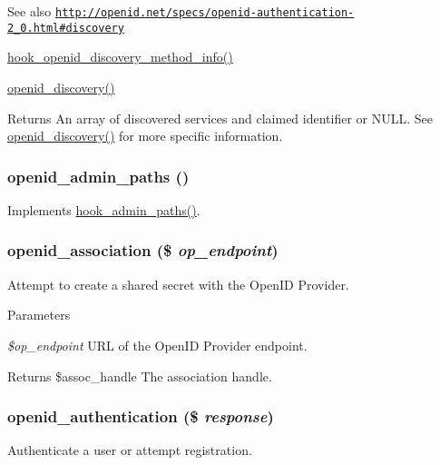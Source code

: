 \begin{DoxySeeAlso}{See also}
\href{http://openid.net/specs/openid-authentication-2_0.html#discovery}{\tt http://openid.net/specs/openid-\/authentication-\/2\_\-0.html\#discovery} 

\hyperlink{group__hooks_gaec6cbfdd913d8ba670c991b87bbf9676}{hook\_\-openid\_\-discovery\_\-method\_\-info()} 

\hyperlink{openid_8module_ae52417e5179c251a3256583ea3e67d30}{openid\_\-discovery()}
\end{DoxySeeAlso}
\begin{DoxyReturn}{Returns}
An array of discovered services and claimed identifier or NULL. See \hyperlink{openid_8module_ae52417e5179c251a3256583ea3e67d30}{openid\_\-discovery()} for more specific information. 
\end{DoxyReturn}
\hypertarget{openid_8module_aac1965c6df11df447cef2984b059de23}{
\subsubsection[{openid\_\-admin\_\-paths}]{\setlength{\rightskip}{0pt plus 5cm}openid\_\-admin\_\-paths ()}}
\label{openid_8module_aac1965c6df11df447cef2984b059de23}
Implements \hyperlink{group__hooks_ga3fe6d93afc8bb04afbd9e3c326d1bdc1}{hook\_\-admin\_\-paths()}. \hypertarget{openid_8module_a305374e14009f439fbef9733223b6660}{
\subsubsection[{openid\_\-association}]{\setlength{\rightskip}{0pt plus 5cm}openid\_\-association (\$ {\em op\_\-endpoint})}}
\label{openid_8module_a305374e14009f439fbef9733223b6660}
Attempt to create a shared secret with the OpenID Provider.


\begin{DoxyParams}{Parameters}
\item[{\em \$op\_\-endpoint}]URL of the OpenID Provider endpoint.\end{DoxyParams}
\begin{DoxyReturn}{Returns}
\$assoc\_\-handle The association handle. 
\end{DoxyReturn}
\hypertarget{openid_8module_a40916dd14d08da91ecd140824aac9578}{
\subsubsection[{openid\_\-authentication}]{\setlength{\rightskip}{0pt plus 5cm}openid\_\-authentication (\$ {\em response})}}
\label{openid_8module_a40916dd14d08da91ecd140824aac9578}
Authenticate a user or attempt registration.


